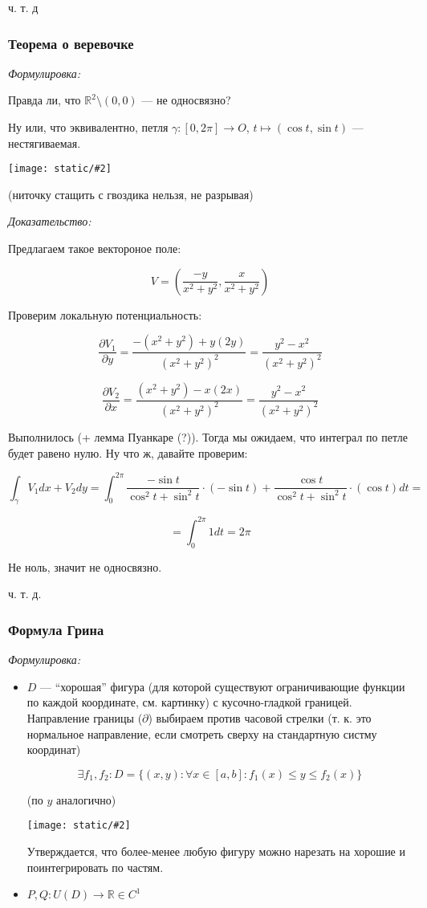 \documentclass{article}
\def\images#1#2{\begin{center}\texttt{[image: static/\#2]}\end{center}}
\begin{document}
ч. т. д


\subsubsection{Теорема о веревочке}
\textit{Формулировка:}

Правда ли, что $\mathbb{R}^2 \setminus (0, 0)$ --- не односвязно? 

Ну или, что эквивалентно, петля $\gamma: [0, 2\pi] \rightarrow O$, $t \mapsto (\cos t, \sin t)$ --- нестягиваемая.

\images{0.5}{lemm_o_ver.jpg}

(ниточку стащить с гвоздика нельзя, не разрывая)

\textit{Доказательство:}

Предлагаем такое вектороное поле:

\[V = \left( \frac{-y}{x^2 + y^2}, \frac{x}{x^2 + y^2}\right)\]

Проверим локальную потенциальность:

\[\frac{\partial V_1}{\partial y} = \frac{-(x^2 + y^2) + y(2y)}{(x^2 + y^2)^2} = \frac{y^2 - x^2}{(x^2 + y^2)^2}\]

\[\frac{\partial V_2}{\partial x} = \frac{(x^2 + y^2) - x(2x)}{(x^2 + y^2)^2} = \frac{y^2 - x^2}{(x^2 + y^2)^2}\]

Выполнилось (+ лемма Пуанкаре (?)). Тогда мы ожидаем, что интеграл по петле будет равено нулю. Ну что ж, давайте проверим:

\[\int_{\gamma} V_1 dx + V_2 dy = \int_{0}^{2\pi} \frac{-\sin t}{\cos^2 t + \sin^2 t} \cdot (- \sin t) + \frac{\cos t}{\cos^2 t + \sin^2 t} \cdot (\cos t) dt = \]

\[= \int_0^{2\pi} 1 dt = 2\pi\]

Не ноль, значит не односвязно. 

ч. т. д. 

\subsubsection{Формула Грина}
\textit{Формулировка:}

\begin{itemize}
    \item $D$ --- ``хорошая'' фигура (для которой существуют ограничивающие функции по каждой координате, см. картинку) с кусочно-гладкой границей. Направление границы ($\partial$) выбираем против часовой стрелки (т. к. это нормальное направление, если смотреть сверху на стандартную систму координат)
    
    \[\exists f_1, f_2: D = \{(x, y): \forall x \in [a, b]: f_1(x) \le y \le f_2(x)\}\]

    (по $y$ аналогично)

    \images{0.5}{green.jpg}

    Утверждается, что более-менее любую фигуру можно нарезать на хорошие и поинтегрировать по частям.

    \item $P, Q: U(D) \rightarrow \mathbb{R} \in C^1$
\end{itemize}
\end{document}
